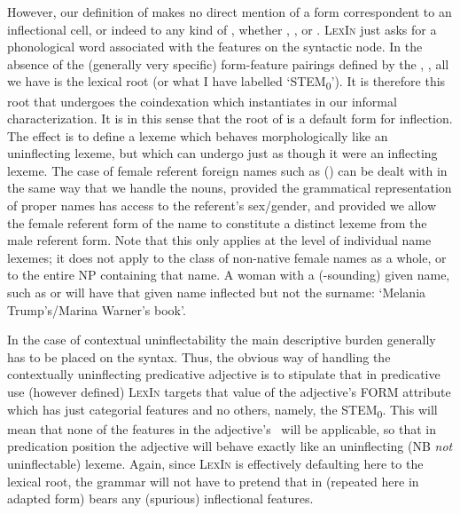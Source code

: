 \documentclass[output=paper,colorlinks,citecolor=brown]{langscibook}
\begin{document}
\ea\label{kengurulexrep}
\z
However, our definition of  makes no direct mention of a form correspondent to an inflectional cell, or indeed to any kind of , whether \PC, \PF, or \PR.   \textsc{LexIn} just asks for a phonological word associated with the features on the syntactic node. In the absence of the (generally very specific) form-feature pairings defined by the \PF, \PR, all we have is the lexical root (or what I have labelled `STEM\textsubscript{0}'). It is therefore this root that undergoes the coindexation which instantiates  in our informal characterization. It is in this sense that the root of  is a default form for inflection. The effect is to define a lexeme which behaves morphologically like an uninflecting lexeme, but which can undergo  just as though it were an inflecting lexeme. The case of  female referent foreign names such as ()  can be dealt with in the same way that we handle the nouns, provided the grammatical representation of proper names has access to the referent's sex/gender, and provided we allow the female referent form of the name to constitute a distinct lexeme from the male referent form. Note that this only applies at the level of individual name lexemes; it does not apply to the class of non-native female names as a whole, or to the entire  NP containing that name. A woman with a  (-sounding) given name, such as  or  will have that given name inflected but not the surname:  `Melania Trump's/Marina Warner's book'. 

In the case of contextual uninflectability  the main descriptive burden generally has to be placed on the syntax. Thus, the obvious way of handling the  contextually uninflecting  predicative adjective is to stipulate that in predicative use (however defined) \textsc{LexIn} targets that value of the adjective's FORM attribute which has just categorial features and no others, namely, the STEM\textsubscript{0}. This will mean that none of the features in the adjective's \PC\ will be applicable, so that in predication position the adjective will behave exactly like an uninflecting (NB \emph{not} uninflectable) lexeme. Again, since \textsc{LexIn} is effectively defaulting here  to the lexical root,  the grammar will not have to pretend that  in   (repeated here in adapted form) bears any (spurious) inflectional features.
\end{document}

